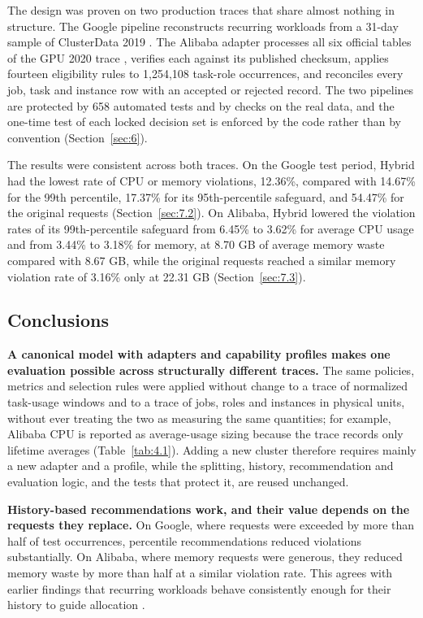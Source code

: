 The design was proven on two production traces that share almost nothing in structure. The Google pipeline reconstructs recurring workloads from a 31-day sample of ClusterData 2019 \cite{ref7}. The Alibaba adapter processes all six official tables of the GPU 2020 trace \cite{ref19}, verifies each against its published checksum, applies fourteen eligibility rules to 1,254,108 task-role occurrences, and reconciles every job, task and instance row with an accepted or rejected record. The two pipelines are protected by 658 automated tests and by checks on the real data, and the one-time test of each locked decision set is enforced by the code rather than by convention (Section~\ref{sec:6}).

The results were consistent across both traces. On the Google test period, Hybrid had the lowest rate of CPU or memory violations, 12.36\%, compared with 14.67\% for the 99th percentile, 17.37\% for its 95th-percentile safeguard, and 54.47\% for the original requests (Section~\ref{sec:7.2}). On Alibaba, Hybrid lowered the violation rates of its 99th-percentile safeguard from 6.45\% to 3.62\% for average CPU usage and from 3.44\% to 3.18\% for memory, at 8.70 GB of average memory waste compared with 8.67 GB, while the original requests reached a similar memory violation rate of 3.16\% only at 22.31 GB (Section~\ref{sec:7.3}).

\subsection{Conclusions}\label{sec:9.2}

\textbf{A canonical model with adapters and capability profiles makes one evaluation possible across structurally different traces.} The same policies, metrics and selection rules were applied without change to a trace of normalized task-usage windows and to a trace of jobs, roles and instances in physical units, without ever treating the two as measuring the same quantities; for example, Alibaba CPU is reported as average-usage sizing because the trace records only lifetime averages (Table~\ref{tab:4.1}). Adding a new cluster therefore requires mainly a new adapter and a profile, while the splitting, history, recommendation and evaluation logic, and the tests that protect it, are reused unchanged.

\textbf{History-based recommendations work, and their value depends on the requests they replace.} On Google, where requests were exceeded by more than half of test occurrences, percentile recommendations reduced violations substantially. On Alibaba, where memory requests were generous, they reduced memory waste by more than half at a similar violation rate. This agrees with earlier findings that recurring workloads behave consistently enough for their history to guide allocation \cite{ref2}.

